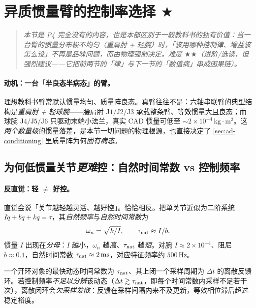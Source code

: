 \section{异质惯量臂的控制率选择 \texorpdfstring{$\bigstar$}{(进阶)}}
\label{sec:actrl-heterogeneous}

\begin{quote}\small\itshape
本节是 P4 完全没有的内容，也是本部区别于一般教科书的独有价值：当一台臂的惯量分布\emph{极不均匀}（重肩肘 + 轻腕）时，「该用哪种控制律、增益该怎么设」不再是品味问题，而由\emph{物理}强制决定。难度 $\bigstar\bigstar$（进阶/选读，但强烈建议——它把前两节的「律」与下一节的「数值病」串成因果链）。
\end{quote}

\paragraph{动机：一台「半良态半病态」的臂。}
理想教科书臂常默认惯量均匀、质量阵良态。真臂往往不是：六轴串联臂的典型结构是\emph{重肩肘 + 轻球腕}——腰肩肘 $\mathrm{J}1/\mathrm{J}2/\mathrm{J}3$ 承载整条臂、等效惯量大且良态；而球腕 $\mathrm{J}4/\mathrm{J}5/\mathrm{J}6$ 只驱动末端小法兰，真实 CAD 惯量可低至 $\sim2\times10^{-4}\,\mathrm{kg\!\cdot\!m^2}$。这\emph{两个数量级}的惯量落差，是本节一切问题的物理根源，也直接决定了 \cref{sec:ad-conditioning} 里质量阵为何\emph{固有病态}。

\subsection{为何低惯量关节\emph{更难}控：自然时间常数 vs 控制频率}
\label{sec:actrl-timescale}

\paragraph{反直觉：轻 $\ne$ 好控。}
直觉会说「关节越轻越灵活、越好控」。恰恰相反。把单关节近似为二阶系统 $I\ddot{q}+b\dot{q}+kq=\tau$，其\emph{自然频率}与\emph{自然时间常数}为
\begin{equation}
  \omega_n=\sqrt{k/I},\qquad \tau_{\rm nat}\approx I/b.
  \label{eq:actrl-omegan}
\end{equation}
惯量 $I$ 出现在\emph{分母}：$I$ 越小，$\omega_n$ 越\emph{高}、$\tau_{\rm nat}$ 越\emph{短}。对腕 $I\approx2\times10^{-4}$、阻尼 $b\approx0.1$，自然时间常数 $\tau_{\rm nat}\approx2\,\mathrm{ms}$，对应特征频率约 $500\,\mathrm{Hz}$。

\begin{theorem}[采样定理对控制率的强制]
\label{thm:actrl-undersample}
一个开环对象的最快动态时间常数为 $\tau_{\rm nat}$、其上闭一个采样周期为 $\Delta t$ 的离散反馈环。若控制频率\emph{不足以分辨}该动态（$\Delta t\gtrsim\tau_{\rm nat}$，即每个时间常数内采样不足若干次），离散闭环会\emph{欠采样发散}：反馈在采样间隔内来不及更新，等效相位滞后超过稳定裕度。
\end{theorem}

